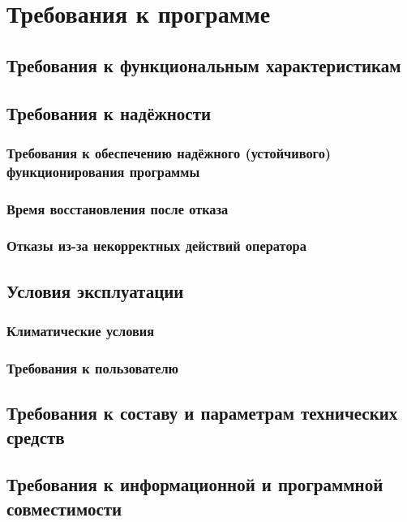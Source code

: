 \section{Требования к программе}

\subsection{Требования к функциональным характеристикам}



\subsection{Требования к надёжности}

\subsubsection{Требования к обеспечению надёжного (устойчивого) функционирования программы}

\subsubsection{Время восстановления после отказа}

\subsubsection{Отказы из-за некорректных действий оператора}

\subsection{Условия эксплуатации}

\subsubsection{Климатические условия}


\subsubsection{Требования к пользователю}


\subsection{Требования к составу и параметрам технических средств}

\subsection{Требования к информационной и программной совместимости}

